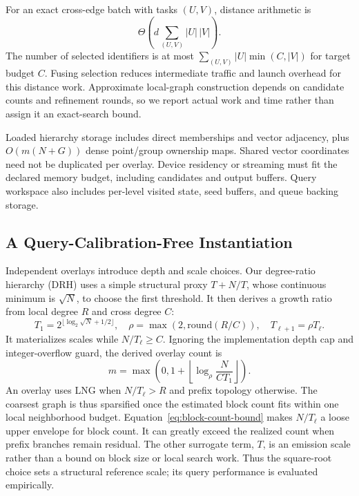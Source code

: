 For an exact cross-edge batch with tasks $(U,V)$, distance arithmetic is
\begin{equation}
 \Theta\!\left(d\sum_{(U,V)}|U|\,|V|\right).
\end{equation}
The number of selected identifiers is at most
$\sum_{(U,V)}|U|\min(C,|V|)$ for target budget $C$.  Fusing selection reduces intermediate traffic and launch overhead
for this distance work.  Approximate local-graph construction depends on candidate
counts and refinement rounds, so we report actual work and time rather than
assign it an exact-search bound.

Loaded hierarchy storage includes direct memberships and vector adjacency,
plus $O(m(N+G))$ dense point/group ownership maps.  Shared vector coordinates
need not be duplicated per overlay.  Device residency or streaming must fit
the declared memory budget, including candidates and output buffers.  Query
workspace also includes per-level visited state, seed buffers, and queue backing storage.

\subsection{A Query-Calibration-Free Instantiation}
\label{sec:drh}
Independent overlays introduce depth and scale choices. Our degree-ratio
hierarchy (DRH) uses a simple
structural proxy $T+N/T$, whose continuous minimum is $\sqrt N$, to choose
the first threshold.  It then derives a growth ratio from local degree $R$
and cross degree $C$:
\begin{equation}
 T_1=2^{\lfloor\log_2\sqrt N+1/2\rfloor},\quad
 \rho=\max(2,\mathrm{round}(R/C)),\quad T_{\ell+1}=\rho T_\ell.
\end{equation}
It materializes scales while $N/T_\ell\ge C$.  Ignoring the implementation
depth cap and integer-overflow guard, the derived overlay count is
\begin{equation}
 m=\max\!\left(0,1+\left\lfloor\log_\rho\frac{N}{CT_1}\right\rfloor\right).
\end{equation}
An overlay uses LNG when $N/T_\ell>R$ and prefix topology otherwise.  The
coarsest graph is thus sparsified once the estimated block count fits within
one local neighborhood budget.  Equation~\ref{eq:block-count-bound} makes $N/T_\ell$ a loose upper envelope
for block count. It can greatly exceed the realized count when prefix branches
remain residual. The other surrogate term, $T$, is an emission scale rather
than a bound on block size or local search work. Thus the square-root choice
sets a structural reference scale; its query performance is evaluated empirically.

